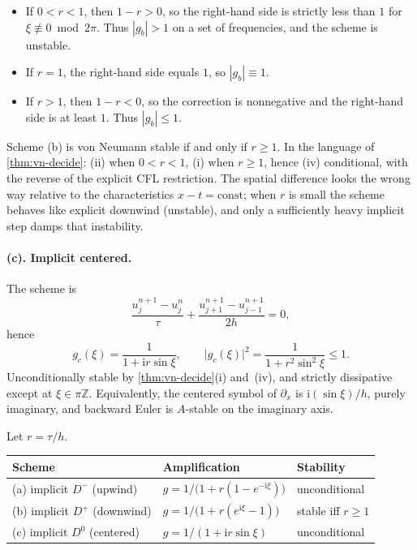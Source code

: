 \documentclass[11pt,a4paper]{article}
\begin{document}
\begin{itemize}
    \item If \(0<r<1\), then \(1-r>0\), so the right-hand side is strictly less than \(1\) for \(\xi\not\equiv 0\bmod 2\pi\). Thus \(|g_b|>1\) on a set of frequencies, and the scheme is unstable.
    \item If \(r=1\), the right-hand side equals \(1\), so \(|g_b|\equiv 1\).
    \item If \(r>1\), then \(1-r<0\), so the correction is nonnegative and the right-hand side is at least \(1\). Thus \(|g_b|\le 1\).
\end{itemize}

Scheme (b) is von Neumann stable if and only if \(r\ge 1\). In the language of \cref{thm:vn-decide}: (ii) when \(0<r<1\), (i) when \(r\ge 1\), hence (iv) conditional, with the reverse of the explicit CFL restriction. The spatial difference looks the wrong way relative to the characteristics \(x-t=\mathrm{const}\); when \(r\) is small the scheme behaves like explicit downwind (unstable), and only a sufficiently heavy implicit step damps that instability.

\paragraph{(c). Implicit centered.}

The scheme is
\[
\frac{u_j^{n+1}-u_j^n}{\tau}
+
\frac{u_{j+1}^{n+1}-u_{j-1}^{n+1}}{2h}
=0,
\]
hence
\[
g_c(\xi)
=
\frac{1}{1+\mathrm i r\sin\xi},
\qquad
\bigl|g_c(\xi)\bigr|^2
=
\frac{1}{1+r^2\sin^2\xi}
\le 1.
\]
Unconditionally stable by \cref{thm:vn-decide}(i) and~(iv), and strictly dissipative except at \(\xi\in\pi\mathbb Z\). Equivalently, the centered symbol of \(\partial_x\) is \(\mathrm i(\sin\xi)/h\), purely imaginary, and backward Euler is \(A\)-stable on the imaginary axis.

\begin{summary}[Problem 4]
\label{sum:p4}
Let \(r=\tau/h\).
{\footnotesize
\begin{center}
\begin{tabular}{@{}>{\raggedright\arraybackslash}p{4.2cm}
                   >{\raggedright\arraybackslash}p{6.4cm}
                   >{\raggedright\arraybackslash}p{3.6cm}@{}}
\toprule
Scheme & Amplification & Stability \\
\midrule
(a) implicit \(D^-\) (upwind) & \(g=1/\bigl(1+r(1-e^{-\mathrm i\xi})\bigr)\) & unconditional \\
(b) implicit \(D^+\) (downwind) & \(g=1/\bigl(1+r(e^{\mathrm i\xi}-1)\bigr)\) & stable iff \(r\ge 1\) \\
(c) implicit \(D^0\) (centered) & \(g=1/(1+\mathrm i r\sin\xi)\) & unconditional \\
\bottomrule
\end{tabular}
\end{center}
}
\end{summary}
\end{document}
